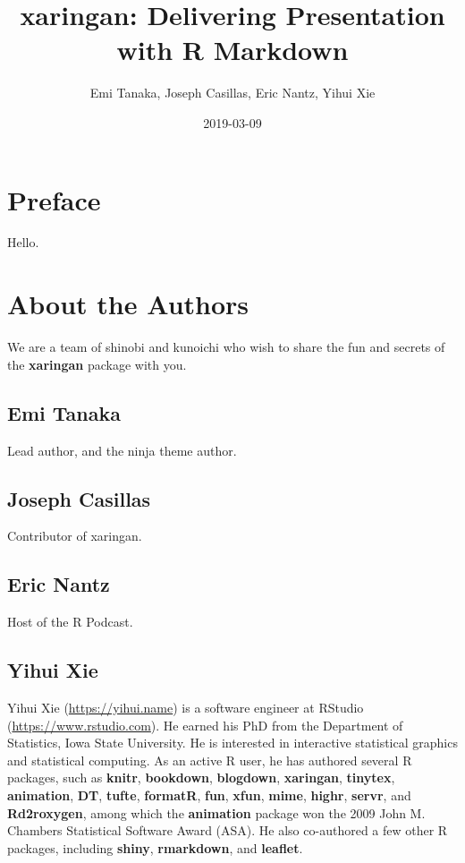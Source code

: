 \documentclass[
]{book}
\title{xaringan: Delivering Presentation with R Markdown}
\author{Emi Tanaka, Joseph Casillas, Eric Nantz, Yihui Xie}
\date{2019-03-09}
\begin{document}
\maketitle

{
\setcounter{tocdepth}{2}
\tableofcontents
}
\hypertarget{preface}{%
\chapter*{Preface}\label{preface}}


Hello.

\hypertarget{author}{%
\chapter*{About the Authors}\label{author}}


We are a team of shinobi and kunoichi who wish to share the fun and secrets of the \textbf{xaringan} package with you.

\hypertarget{emi-tanaka}{%
\section*{Emi Tanaka}\label{emi-tanaka}}


Lead author, and the ninja theme author.

\hypertarget{joseph-casillas}{%
\section*{Joseph Casillas}\label{joseph-casillas}}


Contributor of xaringan.

\hypertarget{eric-nantz}{%
\section*{Eric Nantz}\label{eric-nantz}}


Host of the R Podcast.

\hypertarget{yihui-xie}{%
\section*{Yihui Xie}\label{yihui-xie}}


Yihui Xie (\url{https://yihui.name}) is a software engineer at RStudio (\url{https://www.rstudio.com}). He earned his PhD from the Department of Statistics, Iowa State University. He is interested in interactive statistical graphics and statistical computing. As an active R user, he has authored several R packages, such as \textbf{knitr}, \textbf{bookdown}, \textbf{blogdown}, \textbf{xaringan}, \textbf{tinytex}, \textbf{animation}, \textbf{DT}, \textbf{tufte}, \textbf{formatR}, \textbf{fun}, \textbf{xfun}, \textbf{mime}, \textbf{highr}, \textbf{servr}, and \textbf{Rd2roxygen}, among which the \textbf{animation} package won the 2009 John M. Chambers Statistical Software Award (ASA). He also co-authored a few other R packages, including \textbf{shiny}, \textbf{rmarkdown}, and \textbf{leaflet}.
\end{document}
